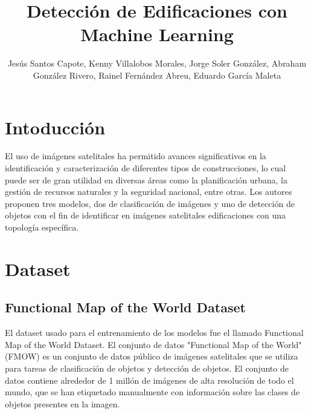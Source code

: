 \documentclass[article]{llncs}
\begin{document}
%
\title{Detecci\'on de Edificaciones con Machine Learning}
%
%
\author{Jes\'us Santos Capote, Kenny Villalobos Morales, Jorge Soler Gonz\'alez, Abraham Gonz\'alez Rivero, 
Rainel Fern\'andez Abreu, Eduardo Garc\'ia Maleta}
%
%
\maketitle              %
%



\section{Intoducci\'on}
El uso de imágenes satelitales ha permitido avances significativos en la identificación y caracterización de diferentes 
tipos de construcciones, lo cual puede ser de gran utilidad en diversas áreas como la planificación urbana, la gestión de 
recursos naturales y la seguridad nacional, entre otras. Los autores proponen tres modelos, dos de clasificación de im\'agenes 
y uno de detección de objetos con el fin de identificar en im\'agenes satelitales edificaciones con una topolog\'ia espec\'ifica.


\section{Dataset}

\subsection{Functional Map of the World Dataset}

El dataset usado para el entrenamiento de los modelos fue el llamado Functional Map of the World Dataset. 
El conjunto de datos "Functional Map of the World" (FMOW) es un conjunto de datos público de imágenes satelitales 
que se utiliza para tareas de clasificación de objetos y detección de objetos. El conjunto de datos contiene alrededor 
de 1 millón de imágenes de alta resolución de todo el mundo, que se han etiquetado manualmente con información sobre 
las clases de objetos presentes en la imagen.
\end{document}
